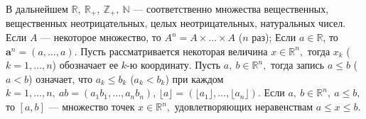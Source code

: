 


В дальнейшем $\mathbb{R},\ 
\mathbb{R}_+,
\ \mathbb{Z}_+,
\ \mathbb{N}$ ---
соответственно множества вещественных, 
вещественных неотрицательных, 
целых неотрицательных, натуральных
чисел.
Если $A$ --- некоторое множество, то $A^n=A\times\ldots \times A$ ($n$ раз);
Если $a\in\mathbb{R}$, то $\mathbf{a}^n=(a,\ldots,a)$.
Пусть рассматривается некоторая величина $x\in\mathbb{R}^n,$ тогда
$x_k$ ($k=1,\ldots,n$) обозначает ее $k$-ю координату. 
Пусть $a,\ b \in \mathbb{R}^n,$ тогда запись $a\leqslant b$ ($a<b$) означает, что 
$a_k\leqslant b_k$ ($a_k<b_k$) при каждом $k=1,\ldots,n,\ ab=(a_1b_1,\ldots,a_n b_n)$,
$\lfloor{a}\rfloor=(\lfloor{a_1}\rfloor,\ldots,\lfloor{a_n}\rfloor)$.
Если $a,\ b \in \mathbb{R}^n,\ a\leqslant b,$ то $[a,b]$ --- множество точек
$x\in \mathbb{R}^n,$ удовлетворяющих неравенствам $a\leqslant x \leqslant b.$



